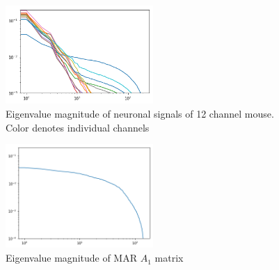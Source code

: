 \documentclass[a4paper,10pt]{article}
\begin{document}
\begin{figure}
  \centering
  \includegraphics[width=0.5\textwidth]{img/example_neuro_PCA_eval_bychannel.png}
  \caption{Eigenvalue magnitude of neuronal signals of 12 channel mouse. Color denotes individual channels}
  \label{fig:neuro_pca_eval}
\end{figure}

\begin{figure}
  \centering
  \includegraphics[width=0.5\textwidth]{img/marN_penny_noinput_A1_PCA_eval.png}
  \caption{Eigenvalue magnitude of MAR $A_1$ matrix}
  \label{fig:marN_penny_pca_eval}
\end{figure}
\end{document}
